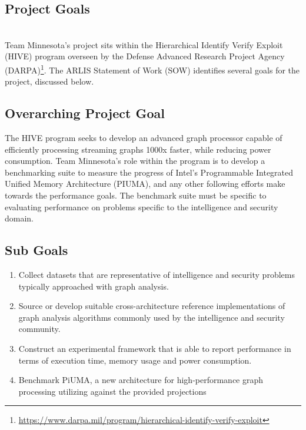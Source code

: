 \documentclass[letterpaper, 10pt]{article}
\begin{document}
\begin{multicols}{2}    
    \section{Project Goals}\label{section:goals}
    
    \\
    Team Minnesota's project sits within the Hierarchical Identify Verify Exploit (HIVE) program overseen by the Defense Advanced Research Project Agency (DARPA)\footnote{\href{https://www.darpa.mil/program/hierarchical-identify-verify-exploit}{https://www.darpa.mil/program/hierarchical-identify-verify-exploit}}. The ARLIS Statement of Work (SOW) identifies several goals for the project, discussed below. 
        \subsection{Overarching Project Goal}\label{section:projectGoal}
        The HIVE program seeks to develop an advanced graph processor capable of efficiently processing streaming graphs 1000x faster, while reducing power consumption. 
        Team Minnesota's role within the program is to develop a benchmarking suite to measure the progress of Intel's Programmable Integrated Unified Memory Architecture (PIUMA), and any other following efforts make towards the performance goals. 
        The benchmark suite must be specific to evaluating performance on problems specific to the intelligence and security domain.
        \subsection{Sub Goals}\label{section:subGoals}
        \begin{enumerate}
        \item Collect datasets that are representative of intelligence and security problems typically approached with graph analysis. 
        \item Source or develop suitable cross-architecture reference implementations of graph analysis algorithms commonly used by the intelligence and security community. 
        \item Construct an experimental framework that is able to report performance in terms of execution time, memory usage and power consumption.
        \item Benchmark PiUMA, a new architecture for high-performance graph processing utilizing against the provided projections 
        \end{enumerate}


\end{multicols}
\end{document}

